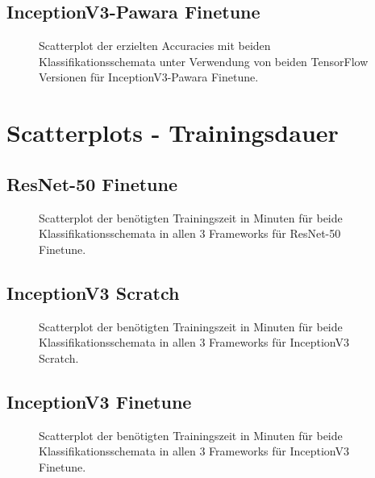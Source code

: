 \section{InceptionV3-Pawara Finetune}
\begin{figure}[H]
\hspace*{-1.5cm}

\caption{Scatterplot der erzielten Accuracies mit beiden Klassifikationsschemata unter Verwendung von beiden TensorFlow \cite{tensorflow} Versionen für InceptionV3-Pawara Finetune.}
\label{fig:ScatterplotIPF}
\end{figure}%
\chapter{Scatterplots - Trainingsdauer}
\label{ch:Anhang_ScatterplotsDauer}
\section{ResNet-50 Finetune}
\begin{figure}[H]
\hspace*{-1.5cm}

\caption{Scatterplot der benötigten Trainingszeit in Minuten für beide Klassifikationsschemata in allen 3 Frameworks für ResNet-50 Finetune.}
\label{fig:ScatterplotRF-dauer}
\end{figure}%
\newpage%
\section{InceptionV3 Scratch}
\begin{figure}[H]
\hspace*{-1.5cm}

\caption{Scatterplot der benötigten Trainingszeit in Minuten für beide Klassifikationsschemata in allen 3 Frameworks für InceptionV3 Scratch.}
\label{fig:ScatterplotIS-dauer}
\end{figure}%
\newpage%
\section{InceptionV3 Finetune}
\begin{figure}[H]
\hspace*{-1.5cm}

\caption{Scatterplot der benötigten Trainingszeit in Minuten für beide Klassifikationsschemata in allen 3 Frameworks für InceptionV3 Finetune.}
\label{fig:ScatterplotIF-dauer}
\end{figure}%
\newpage%

